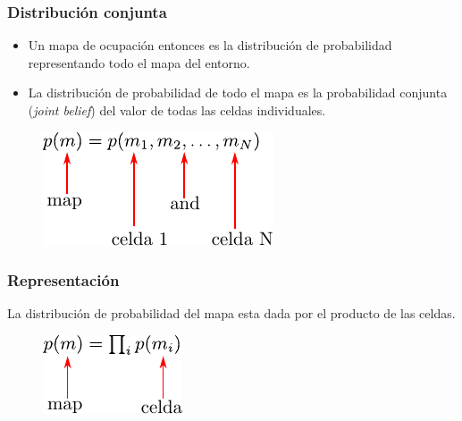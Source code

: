 \begin{frame}
    \frametitle{Distribución conjunta}
    
    \begin{itemize}
        \item Un mapa de ocupación entonces es la distribución de probabilidad representando todo el mapa del entorno.

        \item La distribución de probabilidad de todo el mapa es la probabilidad conjunta (\emph{joint belief}) del valor de todas las celdas individuales.
    \end{itemize}

    
   	\begin{figure}[!h]
    	\includegraphics[width=0.5\columnwidth]{./images/joint_distribution.pdf}
    \end{figure}
    
\end{frame}

\begin{frame}
    \frametitle{Representación}
    La distribución de probabilidad del mapa esta dada por el producto de las celdas.
    
   	\begin{figure}[!h]
    	\includegraphics[width=0.3\columnwidth]{./images/map_probability_distribution.pdf}
    \end{figure}
    
\end{frame}

